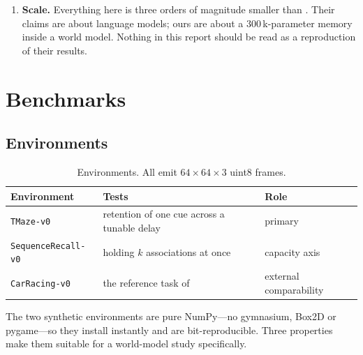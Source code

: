 \documentclass[11pt,a4paper]{article}
\newcommand{\code}[1]{\texttt{\small #1}}
\begin{document}
\begin{enumerate}[leftmargin=*]
Two less invasive-looking alternatives were tried first and are recorded because
both are tempting and both are worse. Normalising the generated target $\hat v$
stabilises the recurrence but destroys the magnitude of the quantity the update
regresses on: measured, decision accuracy at corridor~32 fell from $1.000$ to
chance while the training curve looked healthy for the first ${\sim}25$ epochs,
so the damage was invisible early. Tying retention to the write rate
($\alpha\le1-\eta$) is harmless but pointless---the learned $\alpha$ settles near
$0.77$ either way, so the constraint never binds.

\item \textbf{Scale.} Everything here is three orders of magnitude smaller than
\cite{behrouz2025nested}. Their claims are about language models; ours are about
a $300$\,k-parameter memory inside a world model. Nothing in this report should
be read as a reproduction of their results.
\end{enumerate}

\section{Benchmarks}
\label{sec:bench}

\subsection{Environments}

\begin{table}[h]
\centering
\begin{tabular}{lll}
\toprule
Environment & Tests & Role \\
\midrule
\code{TMaze-v0}          & retention of one cue across a tunable delay & primary \\
\code{SequenceRecall-v0} & holding $k$ associations at once            & capacity axis \\
\code{CarRacing-v0}      & the reference task of \cite{ha2018world}    & external comparability \\
\bottomrule
\end{tabular}
\caption{Environments. All emit $64\times64\times3$ uint8 frames.}
\end{table}

The two synthetic environments are pure NumPy---no gymnasium, Box2D or
pygame---so they install instantly and are bit-reproducible. Three properties
make them suitable for a world-model study specifically.
\end{document}
